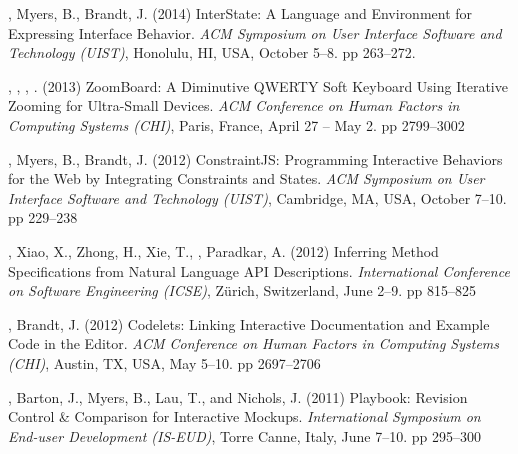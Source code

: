  {
    , Myers, B., Brandt, J. (2014) InterState: A Language and Environment for Expressing Interface Behavior. \textit{ACM Symposium on User Interface Software and Technology (UIST)}, Honolulu, HI, USA, October 5--8.  pp 263--272.
}

 {
    , , , . (2013) ZoomBoard: A Diminutive QWERTY Soft Keyboard Using Iterative Zooming for Ultra-Small Devices. \textit{ACM Conference on Human Factors in Computing Systems (CHI)}, Paris, France, April 27 -- May 2. pp 2799--3002
}

 {
    , Myers, B., Brandt, J. (2012) ConstraintJS: Programming Interactive Behaviors for the Web by Integrating Constraints and States. \textit{ACM Symposium on User Interface Software and Technology (UIST)}, Cambridge, MA, USA, October 7--10. pp 229--238
}

 {
    , Xiao, X., Zhong, H., Xie, T., , Paradkar, A. (2012) Inferring Method Specifications from Natural Language API Descriptions. \textit{International Conference on Software Engineering (ICSE)}, Z{\"u}rich, Switzerland, June 2--9. pp 815--825
}

 {
    , Brandt, J. (2012) Codelets: Linking Interactive Documentation and Example Code in the Editor. \textit{ACM Conference on Human Factors in Computing Systems (CHI)}, Austin, TX, USA, May 5--10. pp 2697--2706
}

 {
    , Barton, J., Myers, B., Lau, T., and Nichols, J. (2011) Playbook: Revision Control \& Comparison for Interactive Mockups. \textit{International Symposium on End-user Development (IS-EUD)}, Torre Canne, Italy, June 7--10. pp 295--300
}


